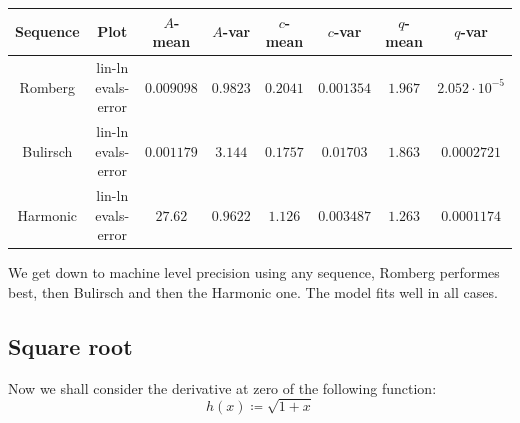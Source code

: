 \begin{table}[H]
    \centering
    \small
    \begin{tabular}{c|c||c|c|c|c|c|c}
Sequence & Plot & \(A\)-mean & \(A\)-var & \(c\)-mean & \(c\)-var & \(q\)-mean & \(q\)-var\\\hline
\rowcolor{green}
Romberg & lin-ln evals-error & \(0.009098\) & \(0.9823\) & \(0.2041\) & \(0.001354\) & \(1.967\) & \(2.052\cdot 10^{-5}\) \\
\rowcolor{green}
Bulirsch & lin-ln evals-error & \(0.001179\) & \(3.144\) & \(0.1757\) & \(0.01703\) & \(1.863\) & \(0.0002721\) \\
\rowcolor{green}
Harmonic & lin-ln evals-error & \(27.62\) & \(0.9622\) & \(1.126\) & \(0.003487\) & \(1.263\) & \(0.0001174\) \\
    \end{tabular}
    \label{tab:my_label}
\end{table}

We get down to machine level precision using any sequence, Romberg performes best, then Bulirsch and then the Harmonic one. The model fits well in all cases.

\subsection{Square root}

Now we shall consider the derivative at zero of the following function:
\[
h(x) \coloneqq \sqrt{1 + x}
\]

